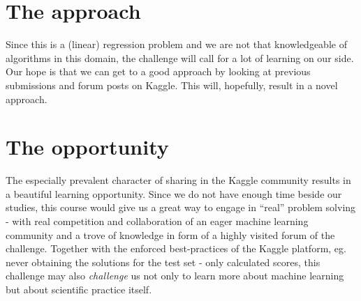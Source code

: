 \documentclass[colorback,accentcolor=tud9c,12pt]{tudreport}
\begin{document}
	\section{The approach}
	Since this is a (linear) regression problem and we are not that knowledgeable of algorithms in this domain, the challenge will call for a lot of learning on our side.
	Our hope is that we can get to a good approach by looking at previous submissions and forum posts on Kaggle.
	This will, hopefully, result in a novel approach.
	
	\section{The opportunity}
	The especially prevalent character of sharing in the Kaggle community results in a beautiful learning opportunity. Since we do not have enough time beside our studies, this course would give us a great way to engage in ``real'' problem solving - with real competition and collaboration of an eager machine learning community and a trove of knowledge in form of a highly visited forum of the challenge.
	Together with the enforced best-practices of the Kaggle platform, eg. never obtaining the solutions for the test set - only calculated scores, this challenge may also \textit{challenge} us not only to learn more about machine learning but about scientific practice itself.
	
\end{document}
